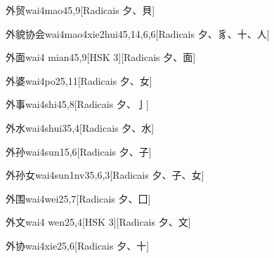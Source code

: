 \begin{entry}{外贸}{wai4mao4}{5,9}[Radicais ⼣、⾙]
\end{entry}

\begin{entry}{外貌协会}{wai4mao4xie2hui4}{5,14,6,6}[Radicais ⼣、⾘、⼗、⼈]
\end{entry}

\begin{entry}{外面}{wai4 mian4}{5,9}[HSK 3][Radicais ⼣、⾯]
\end{entry}

\begin{entry}{外婆}{wai4po2}{5,11}[Radicais ⼣、⼥]
\end{entry}

\begin{entry}{外事}{wai4shi4}{5,8}[Radicais ⼣、⼅]
\end{entry}

\begin{entry}{外水}{wai4shui3}{5,4}[Radicais ⼣、⽔]
\end{entry}

\begin{entry}{外孙}{wai4sun1}{5,6}[Radicais ⼣、⼦]
\end{entry}

\begin{entry}{外孙女}{wai4sun1nv3}{5,6,3}[Radicais ⼣、⼦、⼥]
\end{entry}

\begin{entry}{外围}{wai4wei2}{5,7}[Radicais ⼣、⼞]
\end{entry}

\begin{entry}{外文}{wai4 wen2}{5,4}[HSK 3][Radicais ⼣、⽂]
\end{entry}

\begin{entry}{外协}{wai4xie2}{5,6}[Radicais ⼣、⼗]
\end{entry}

